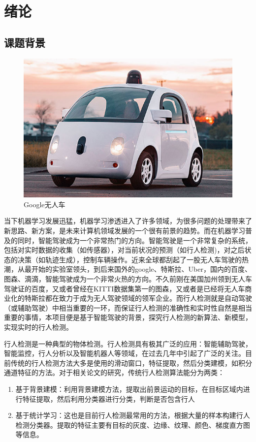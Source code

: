 \chapter{绪论}

\section{课题背景}{
	\begin{figure}[htbp]
	\centering
	\includegraphics[width=5in]{images/WRC.jpg}
	\caption{Google无人车}
	\label{WRC}
	\end{figure}
	当下机器学习发展迅猛，机器学习渗透进入了许多领域，为很多问题的处理带来了新思路、新方案，是未来计算机领域发展的一个很有前景的趋势。而在机器学习普及的同时，智能驾驶成为一个非常热门的方向。智能驾驶是一个非常复杂的系统，包括对实时数据的收集（如传感器），对当前状况的预测（如行人检测)，对之后状态的决策（如轨迹生成），控制车辆操作。近来全球都刮起了一股无人车驾驶的热潮，从最开始的实验室领头，到后来国外的google、特斯拉、Uber，国内的百度、图森、滴滴，智能驾驶成为一个非常火热的方向。不久前刚在美国加州领到无人车驾驶证的百度，又或者曾经在KITTI数据集第一的图森，又或者是已经将无人车商业化的特斯拉都在致力于成为无人驾驶领域的领军企业。而行人检测就是自动驾驶（或辅助驾驶）中相当重要的一环，而保证行人检测的准确性和实时性自然是相当重要的事情，本项目便是基于智能驾驶的背景，探究行人检测的新算法、新模型，实现实时的行人检测。

	行人检测是一种典型的物体检测。行人检测具有极其广泛的应用：智能辅助驾驶，智能监控，行人分析以及智能机器人等领域，在过去几年中引起了广泛的关注。目前传统的行人检测方法大多是使用的滑动窗口，特征提取，然后分类建模，如积分通道特征的方法。对于相关论文的研究\cite{walk2010new,integral}，传统行人检测算法能分为两类：
	\begin{enumerate}
	\item 基于背景建模：利用背景建模方法，提取出前景运动的目标，在目标区域内进行特征提取，然后利用分类器进行分类，判断是否包含行人
	\item 基于统计学习：这也是目前行人检测最常用的方法，根据大量的样本构建行人检测分类器。提取的特征主要有目标的灰度、边缘、纹理、颜色、梯度直方图等信息。
	\end{enumerate}

}
